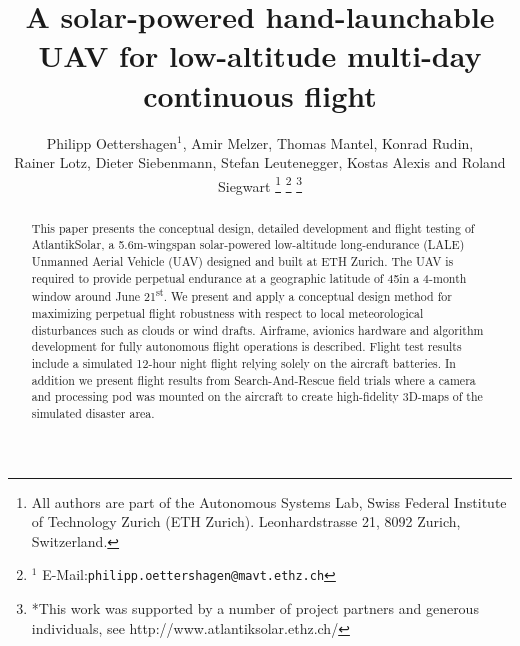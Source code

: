 \documentclass[letterpaper, 10 pt, conference]{ieeeconf}  %
\title{\LARGE \bf A solar-powered hand-launchable UAV for low-altitude multi-day continuous flight}
\author{Philipp Oettershagen$^{1}$, Amir Melzer, Thomas Mantel, Konrad Rudin, \\ Rainer Lotz, Dieter Siebenmann, Stefan Leutenegger, Kostas Alexis and Roland Siegwart%
\thanks{All authors are part of the Autonomous Systems Lab, Swiss Federal Institute of Technology Zurich (ETH Zurich). Leonhardstrasse 21, 8092 Zurich, Switzerland. }
\thanks{$^{1}$ E-Mail:{\tt philipp.oettershagen@mavt.ethz.ch}}%
\thanks{*This work was supported by a number of project partners and generous individuals, see http://www.atlantiksolar.ethz.ch/  }%
 }
\begin{document}
\maketitle
\thispagestyle{empty}
\pagestyle{empty}

\begin{abstract}
This paper presents the conceptual design, detailed development and flight testing of AtlantikSolar, a 5.6m-wingspan solar-powered low-altitude long-endurance (LALE) Unmanned Aerial Vehicle (UAV) designed and built at ETH Zurich. The UAV is required to provide perpetual endurance at a geographic latitude of 45\degree in a 4-month window around June 21\textsuperscript{st}. We present and apply a conceptual design method for maximizing perpetual flight robustness with respect to local meteorological disturbances such as clouds or wind drafts. Airframe, avionics hardware and algorithm development for fully autonomous flight operations is described. Flight test results include a simulated 12-hour night flight relying solely on the aircraft batteries. In addition we present flight results from Search-And-Rescue field trials where a camera and processing pod was mounted on the aircraft to create high-fidelity 3D-maps of the simulated disaster area. 
\end{abstract}








\end{document}
